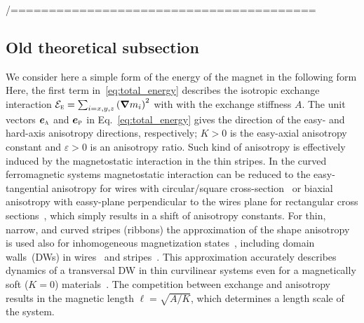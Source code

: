 
/========================================

\subsection{Old theoretical subsection}

We consider here a simple form of the energy of the magnet in the following form%
Here, the first term in~\eqref{eq:total_energy} describes the isotropic exchange interaction $\mathcal{E}_\textsc{e}=\sum_{i=x,y,z}\left(\vec{\nabla} m_i\right)^2$ with with the exchange stiffness $A$. The unit vectors $\vec{e}_\textsc{a}$ and $\vec{e}_\textsc{p}$ in Eq.~\eqref{eq:total_energy} gives the direction of the easy- and hard-axis anisotropy directions, respectively; $K>0$ is the easy-axial anisotropy constant and $\varepsilon>0$ is an anisotropy ratio. Such kind of anisotropy is effectively induced by the magnetostatic interaction in the thin stripes. In the curved ferromagnetic systems magnetostatic interaction can be reduced to the easy-tangential anisotropy for wires with circular/square cross-section~\cite{Slastikov12} or biaxial anisotropy with eassy-plane perpendicular to the wires plane for rectangular cross sections~\cite{Aharoni98,Gaididei17a}, which simply results in a shift of anisotropy constants. For thin, narrow, and curved stripes (ribbons) the approximation of the shape anisotropy is used also for inhomogeneous magnetization states~\cite{Gaididei17a}, including domain walls~(DWs) in wires~\cite{Yershov15b,Yershov16,Pylypovskyi16} and stripes~\cite{Yershov18a,Volkov19c}. This approximation accurately describes dynamics of a transversal DW in thin curvilinear systems even for a magnetically soft ($K = 0$) materials~\cite{Yershov15b,Yershov16,Pylypovskyi16,Yershov18a,Volkov19c}.  The competition between exchange and anisotropy results in the magnetic length $\ell=\sqrt{A/K}$, which determines a length scale of the system.%

